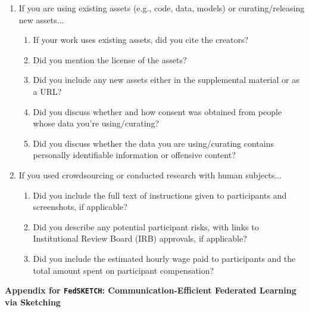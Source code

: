 \documentclass[11pt]{article}
\begin{document}
\begin{enumerate}
\item If you are using existing assets (e.g., code, data, models) or curating/releasing new assets...
\begin{enumerate}
  \item If your work uses existing assets, did you cite the creators?
    \answerYes{}
  \item Did you mention the license of the assets?
    \answerNA{}
  \item Did you include any new assets either in the supplemental material or as a URL?
    \answerNA{}
  \item Did you discuss whether and how consent was obtained from people whose data you're using/curating?
    \answerNA{}
  \item Did you discuss whether the data you are using/curating contains personally identifiable information or offensive content?
    \answerNA{}
\end{enumerate}

\item If you used crowdsourcing or conducted research with human subjects...
\begin{enumerate}
  \item Did you include the full text of instructions given to participants and screenshots, if applicable?
    \answerNA{}
  \item Did you describe any potential participant risks, with links to Institutional Review Board (IRB) approvals, if applicable?
    \answerNA{}
  \item Did you include the estimated hourly wage paid to participants and the total amount spent on participant compensation?
    \answerNA{}
\end{enumerate}

\end{enumerate}


\clearpage

\appendix
%





 {\Large\bfseries Appendix for \texttt{FedSKETCH}: Communication-Efficient Federated Learning
via Sketching \par}
\end{document}
